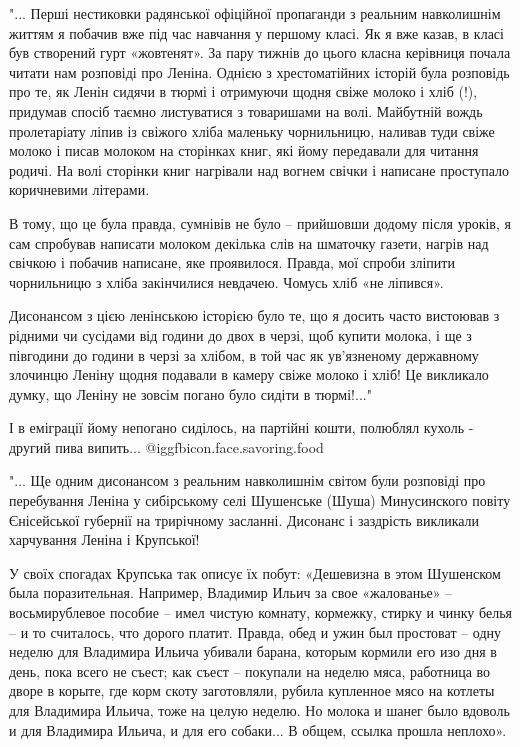 \begin{itemize}
"... Перші нестиковки радянської офіційної пропаганди з реальним навколишнім
життям я побачив вже під час навчання у першому класі. Як я вже казав, в класі
був створений гурт «жовтенят». За пару тижнів до цього класна керівниця почала
читати нам розповіді про Леніна. Однією з хрестоматійних історій була розповідь
про те, як Ленін сидячи в тюрмі і отримуючи щодня свіже молоко і хліб (!),
придумав спосіб таємно листуватися з товаришами на волі. Майбутній вождь
пролетаріату ліпив із свіжого хліба маленьку чорнильницю, наливав туди свіже
молоко і писав молоком на сторінках книг, які йому передавали для читання
родичі. На волі сторінки книг нагрівали над вогнем свічки і написане проступало
коричневими літерами.

В тому, що це була правда, сумнівів не було – прийшовши додому після уроків, я
сам спробував написати молоком декілька слів на шматочку газети, нагрів над
свічкою і побачив написане, яке проявилося. Правда, мої спроби зліпити
чорнильницю з хліба закінчилися невдачею. Чомусь хліб «не ліпився».

Дисонансом з цією ленінською історією було те, що я досить часто вистоював з
рідними чи сусідами від години до двох в черзі, щоб купити молока, і ще з
півгодини до години в черзі за хлібом, в той час як ув’язненому державному
злочинцю Леніну щодня подавали в камеру свіже молоко і хліб! Це викликало
думку, що Леніну не зовсім погано було сидіти в тюрмі!..."

\begin{itemize} %
І в еміграції йому непогано сиділось, на партійні кошти, полюблял кухоль - другий пива випить... @igg{fbicon.face.savoring.food} 
\end{itemize} %


"... Ще одним дисонансом з реальним навколишнім світом були розповіді про
перебування Леніна у сибірському селі Шушенське (Шуша) Минусинского повіту
Єнісейської губернії на трирічному засланні. Дисонанс і заздрість викликали
харчування Леніна і Крупської!

У своїх спогадах Крупська так описує їх побут: «Дешевизна в этом Шушенском была
поразительная. Например, Владимир Ильич за свое «жалованье» – восьмирублевое
пособие – имел чистую комнату, кормежку, стирку и чинку белья – и то считалось,
что дорого платит. Правда, обед и ужин был простоват – одну неделю для
Владимира Ильича убивали барана, которым кормили его изо дня в день, пока всего
не съест; как съест – покупали на неделю мяса, работница во дворе в корыте, где
корм скоту заготовляли, рубила купленное мясо на котлеты для Владимира Ильича,
тоже на целую неделю. Но молока и шанег было вдоволь и для Владимира Ильича, и
для его собаки... В общем, ссылка прошла неплохо».


\end{itemize}
